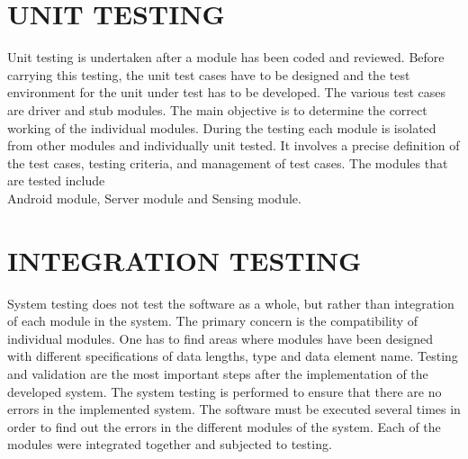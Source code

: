 \documentclass[12pt,a4paper,oneside]{report}
\begin{document}
{\section{UNIT TESTING}
\par Unit testing is undertaken after a module has been coded and reviewed. Before carrying this testing, the unit test cases have to be designed and the test environment for the unit under test has to be developed. The various test cases are driver and stub modules. The main objective is to determine the correct working of the individual modules. During the testing each module is isolated from other modules and individually unit tested. It involves a precise definition of the test cases, testing criteria, and management of test cases. The modules that are tested include \\
Android module, Server module and Sensing module.

\section{INTEGRATION TESTING}
\par System testing does not test the software as a whole, but rather than integration of each module in the system. The primary concern is the compatibility of individual modules. One has to find areas where modules have been designed with different specifications of data lengths, type and data element name. Testing and validation are the most important steps after the implementation of the developed system. The system testing is performed to ensure that there are no errors in the implemented system. The software must be executed several times in order to find out the errors in the different modules of the system. Each of the modules were integrated together and subjected to testing. \\
}
\end{document}
